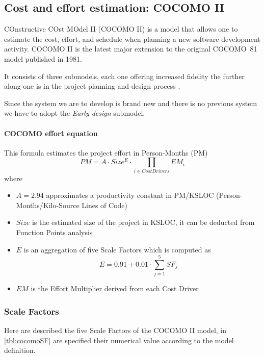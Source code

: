\subsection{Cost and effort estimation: COCOMO II} 
COnstructive COst MOdel II (COCOMO II) is a model that allows one to estimate the cost, effort, and schedule when planning a new software development activity. COCOMO II is the latest major extension to the original \mbox{COCOMO 81} model published in 1981.

It consists of three submodels, each one offering increased fidelity the further along one is in the project planning and design process \cite{COCOMO}.

Since the system we are to develop is brand new and there is no previous system we have to adopt the \emph{Early design} submodel.

\paragraph{COCOMO effort equation}This formula estimates the project effort in Person-Months (PM)
$$PM = A \cdot Size^{E} \cdot \prod_{i \in CostDrivers}EM_{i}$$
where 
\begin{itemize}
	\item $A=2.94$ approximates a productivity constant in PM/KSLOC (Person-Months/Kilo-Source Lines of Code)
	\item $Size$ is the estimated size of the project in KSLOC, it can be deducted from Function Points analysis
	\item $E$ is an aggregation of five Scale Factors which is computed as $$E = 0.91 + 0.01 \cdot \sum_{j=1}^{5}{SF_j}$$
	\item $EM$ is the Effort Multiplier derived from each Cost Driver
\end{itemize}

\clearpage

\subsubsection{Scale Factors}
Here are described the five Scale Factors of the COCOMO II model, in \autoref{tbl:cocomoSF} are specified their numerical value according to the model definition. 
 
